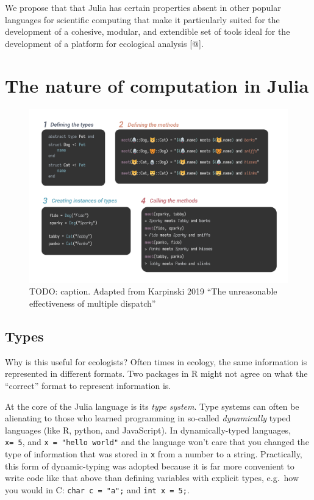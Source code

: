 \documentclass[11pt]{article}
\makeatletter
\def\maxwidth{\ifdim\Gin@nat@width>\linewidth\linewidth
\else\Gin@nat@width\fi}
\let\Oldincludegraphics\includegraphics
\renewcommand{\includegraphics}[1]{\Oldincludegraphics[width=\maxwidth]{#1}}
\makeatother
\begin{document}
We propose that that Julia has certain properties absent in other
popular languages for scientific computing that make it particularly
suited for the development of a cohesive, modular, and extendible set of
tools ideal for the development of a platform for ecological analysis
{[}@{]}.

\hypertarget{the-nature-of-computation-in-julia}{%
\section{The nature of computation in
Julia}\label{the-nature-of-computation-in-julia}}

\begin{figure}
\centering
\includegraphics{./figures/multiple_dispatch.png}
\caption{TODO: caption. Adapted from Karpinski 2019 ``The unreasonable
effectiveness of multiple dispatch''}
\end{figure}

\hypertarget{types}{%
\subsection{Types}\label{types}}

Why is this useful for ecologists? Often times in ecology, the same
information is represented in different formats. Two packages in R might
not agree on what the ``correct'' format to represent information is.

At the core of the Julia language is its \emph{type system}. Type
systems can often be alienating to those who learned programming in
so-called \emph{dynamically} typed languages (like R, python, and
JavaScript). In dynamically-typed languages, \texttt{x=\ 5}, and
\texttt{x\ =\ "hello\ world"} and the language won't care that you
changed the type of information that was stored in \texttt{x} from a
number to a string. Practically, this form of dynamic-typing was adopted
because it is far more convenient to write code like that above than
defining variables with explicit types, e.g.~how you would in C:
\texttt{char\ c\ =\ "a";} and \texttt{int\ x\ =\ 5;}.
\end{document}
